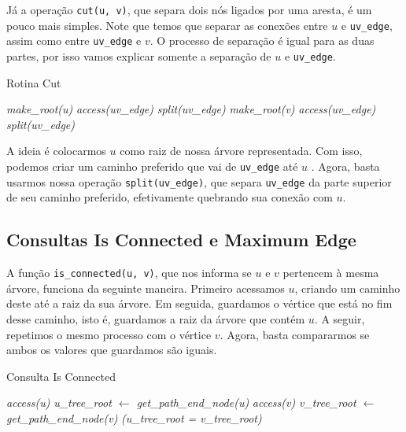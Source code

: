 Já a operação \texttt{cut(u, v)}, que separa dois nós ligados por uma aresta, é um pouco mais simples. Note que temos que separar as conexões entre $u$ e \texttt{uv\_edge}, assim como entre \texttt{uv\_edge} e $v$. O processo de separação é igual para as duas partes, por isso vamos explicar somente a separação de $u$ e \texttt{uv\_edge}.

\begin{algorithm}[h!]
    \caption{Rotina Cut}\label{lct:cut}
    \begin{algorithmic}
        \State {}
        \State \emph{make\_root(u)}
        \State \emph{access(uv\_edge)}
        \State \emph{split(uv\_edge)}
        \State {}
        \State \emph{make\_root(v)}
        \State \emph{access(uv\_edge)}
        \State \emph{split(uv\_edge)}
        \EndFunction
    \end{algorithmic}
\end{algorithm}

A ideia é colocarmos $u$ como raiz de nossa árvore representada. Com isso, podemos criar um caminho preferido que vai de \texttt{uv\_edge} até $u$ . Agora, basta usarmos nossa operação \texttt{split(uv\_edge)}, que separa \texttt{uv\_edge} da parte superior de seu caminho preferido, efetivamente quebrando sua conexão com $u$.

\subsection{Consultas Is Connected e Maximum Edge}
\label{subsection:lct-is-connected}

A função \texttt{is\_connected(u, v)}, que nos informa se $u$ e $v$ pertencem à mesma árvore, funciona da seguinte maneira. Primeiro acessamos $u$, criando um caminho deste até a raiz da sua árvore. Em seguida, guardamos o vértice que está no fim desse caminho, isto é, guardamos a raiz da árvore que contém $u$. A seguir, repetimos o mesmo processo com o vértice $v$. Agora, basta compararmos se ambos os valores que guardamos são iguais.

\begin{algorithm}[h!]
    \caption{Consulta Is Connected}\label{lct:is-connected}
    \begin{algorithmic}
        \State \emph{access(u)}
        \State \emph{u\_tree\_root $\gets$ get\_path\_end\_node(u)}
        \State \emph{access(v)}
        \State \emph{v\_tree\_root $\gets$ get\_path\_end\_node(v)}
        \State \Return \emph{(u\_tree\_root = v\_tree\_root)}
        \EndFunction
    \end{algorithmic}
\end{algorithm}

